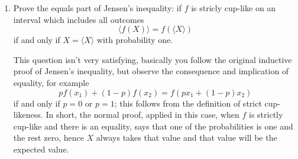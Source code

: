 \documentclass[12pt]{article}
\begin{document}
\begin{enumerate}
\item Prove the equals part of Jensen's inequality: if $f$ is stricly cup-like on an interval which includes all outcomes
\begin{equation}
\langle f(X)\rangle = f(\langle X\rangle)
\end{equation}
if and only if $X=\langle X\rangle$ with probability one.

\soln This question isn't very satisfying, basically you follow the original inductive proof of Jensen's inequality, but observe the consequence and implication of equality, for example
\begin{equation}
pf(x_1)+(1-p)f(x_2)=f(px_1+(1-p)x_2)
\end{equation}
if and only if $p=0$ or $p=1$; this follows from the definition of strict cup-likeness. In short, the normal proof, applied in this case, when $f$ is strictly cup-like and there is an equality, says that one of the probabilities is one and the rest zero, hence $X$ always takes that value and that value will be the expected value.



\end{enumerate}
\end{document}
